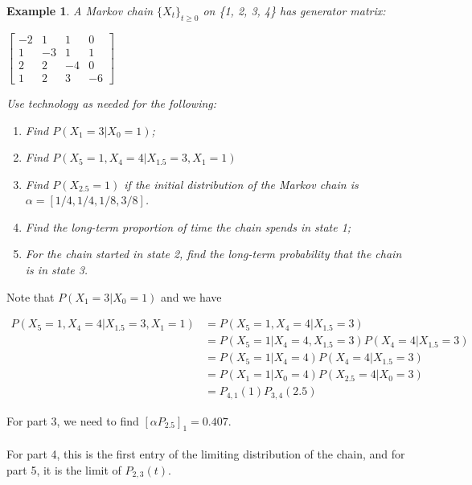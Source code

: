 \documentclass[12pt]{article}
\newtheorem{example}{Example}
\begin{document}
\begin{example}
    A Markov chain $\{X_t\}_{t \geq 0}$ on \{1, 2, 3, 4\} has generator matrix:
    \begin{center}
        $\begin{bmatrix}
        -2 & 1 & 1 & 0 \\
        1 & -3 & 1 & 1 \\
        2 & 2 & -4 & 0 \\
        1 & 2 & 3 & -6
        \end{bmatrix}$
    \end{center}
Use technology as needed for the following:
\begin{enumerate}
    \item Find $P(X_1 = 3 | X_0 = 1)$;
    \item Find $P(X_5 = 1, X_4 = 4 | X_{1.5} = 3, X_1 = 1)$
    \item Find $P(X_{2.5} = 1)$ if the initial distribution of the Markov chain is $\alpha = [1/4, 1/4, 1/8, 3/8]$.
    \item Find the long-term proportion of time the chain spends in state 1;
    \item For the chain started in state 2, find the long-term probability that the chain is in state 3.
\end{enumerate}
\end{example}

Note that $P(X_1 = 3 | X_0 = 1)$ and we have
\begin{center}
    \begin{align*}
        P(X_5 = 1, X_4 = 4 | X_{1.5} = 3, X_1 = 1) & = P(X_5 = 1, X_4 = 4 | X_{1.5} = 3) \\
        & = P(X_5 = 1| X_4 = 4, X_{1.5} = 3) P(X_4 = 4 | X_{1.5} = 3) \\
        & = P(X_5 = 1| X_4 = 4) P(X_4 = 4 | X_{1.5} = 3) \\
        & = P(X_1 = 1| X_0 = 4) P(X_{2.5} = 4| X_0 = 3) \\
        & = P_{4,1}(1)P_{3,4}(2.5)
    \end{align*}
\end{center}

\noindent For part 3, we need to find $[\alpha P_{2.5}]_1 = 0.407$.
\\
\\For part 4, this is the first entry of the limiting distribution of the chain, and for part 5, it is the limit of $P_{2,3}(t)$.
\end{document}
